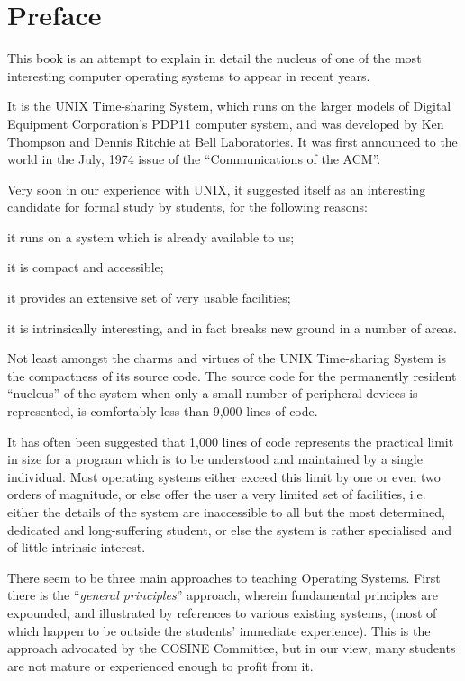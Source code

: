 %
%
\section*{Preface}

This book is an attempt to explain in
detail the nucleus of one of the most
interesting computer operating systems
to appear in recent years.

It is the UNIX Time-sharing System,
which runs on the larger models of
Digital Equipment Corporation's PDP11
computer system, and was developed by
Ken Thompson and Dennis Ritchie at Bell
Laboratories. It was first announced to
the world in the July, 1974 issue of
the ``Communications of the ACM''.

Very soon in our experience with UNIX,
it suggested itself as an interesting
candidate for formal study by students,
for the following reasons:

\bi
\item it runs on a system which is already available to us;

\item it is compact and accessible;

\item it provides an extensive set of very
 usable facilities;

it is intrinsically interesting, and
 in fact breaks new ground in a
 number of areas.
\ei

Not least amongst the charms and virtues of the UNIX Time-sharing System is
the compactness of its source code.
The source code for the permanently
resident ``nucleus'' of the system when
only a small number of peripheral devices is represented, is comfortably
less than 9,000 lines of code.

It has often been suggested that 1,000
lines of code represents the practical
limit in size for a program which is to
be understood and maintained by a single individual.
Most operating systems either exceed
this limit by one or even two orders of
magnitude, or else offer the user a
very limited set of facilities, i.e.
either the details of the system are
inaccessible to all but the most determined, dedicated and long-suffering
student, or else the system is rather
specialised and of little intrinsic
interest.

There seem to be three main approaches
to teaching Operating Systems.
First there is the ``{\it general principles}''
approach, wherein fundamental principles are expounded, and illustrated by
references to various existing systems,
(most of which happen to be outside the
students' immediate experience). This
is the approach advocated by the COSINE
Committee, but in our view, many students are not mature or experienced
enough to profit from it.

